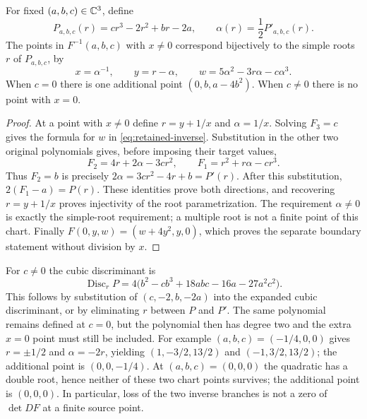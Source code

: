 \begin{proposition}
\label{prop:retained-fibre}
For fixed $(a,b,c)\in\mathbb C^3$, define
\begin{equation}
 P_{a,b,c}(r)=cr^3-2r^2+br-2a,
 \qquad \alpha(r)=\frac12P'_{a,b,c}(r).
 \label{eq:retained-cubic}
\end{equation}
The points in $F^{-1}(a,b,c)$ with $x\ne0$ correspond bijectively
to the simple roots $r$ of $P_{a,b,c}$, by
\begin{equation}
 x=\alpha^{-1},\qquad y=r-\alpha,\qquad
 w=5\alpha^2-3r\alpha-c\alpha^3.
 \label{eq:retained-inverse}
\end{equation}
When $c=0$ there is one additional point
$(0,b,a-4b^2)$. When $c\ne0$ there is no point with $x=0$.
\end{proposition}
\begin{proof}
At a point with $x\ne0$ define $r=y+1/x$ and $\alpha=1/x$.
Solving $F_3=c$ gives the formula for $w$ in
\eqref{eq:retained-inverse}. Substitution in the other two original
polynomials gives, before imposing their target values,
\[
 F_2=4r+2\alpha-3cr^2,\qquad
 F_1=r^2+r\alpha-cr^3.
\]
Thus $F_2=b$ is precisely $2\alpha=3cr^2-4r+b=P'(r)$.
After this substitution, $2(F_1-a)=P(r)$. These identities prove
both directions, and recovering $r=y+1/x$ proves injectivity of the
root parametrization. The requirement $\alpha\ne0$ is exactly
the simple-root requirement; a multiple root is not a finite point
of this chart. Finally $F(0,y,w)=(w+4y^2,y,0)$, which proves the
separate boundary statement without division by $x$.
\end{proof}

For $c\ne0$ the cubic discriminant is
\begin{equation}
 \operatorname{Disc}_r P
 =4\bigl(b^2-cb^3+18abc-16a-27a^2c^2\bigr).
 \label{eq:retained-discriminant}
\end{equation}
This follows by substitution of $(c,-2,b,-2a)$ into the expanded
cubic discriminant, or by eliminating $r$ between $P$ and $P'$.
The same polynomial remains defined at $c=0$, but the polynomial
then has degree two and the extra $x=0$ point must still be included.
For example $(a,b,c)=(-1/4,0,0)$ gives $r=\pm1/2$ and
$\alpha=-2r$, yielding $(1,-3/2,13/2)$ and
$(-1,3/2,13/2)$; the additional point is $(0,0,-1/4)$.
At $(a,b,c)=(0,0,0)$ the quadratic has a double root, hence neither
of these two chart points survives; the additional point is $(0,0,0)$.
In particular, loss of the two inverse branches is not a zero of
$\det DF$ at a finite source point.

